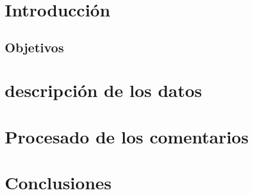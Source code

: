 \chapter{Introducción}


\section{Objetivos}


\chapter{descripción de los datos}




\chapter{Procesado de los comentarios}





\chapter{Conclusiones}

